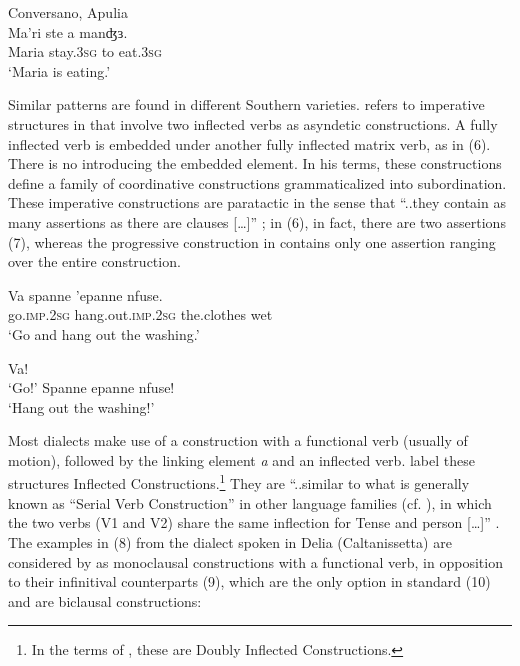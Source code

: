 \documentclass[output=paper]{langsci/langscibook}
\begin{document}
\ea%
         Conversano, Apulia\label{ex:lorusso:5}\\
    \gll Ma'ri  ste     a   manʤɜ.\\
         Maria  stay.\textsc{3sg}  to  eat.\textsc{3sg}\\
    \glt ‘Maria is eating.’
    \z          

Similar patterns are found in different Southern  varieties. \citet{Ledgeway1997} refers to imperative structures in  that involve two inflected verbs as asyndetic constructions. A fully inflected verb is embedded under another fully inflected matrix verb, as in (6). There is no  introducing the embedded element. In his terms, these constructions define a family of coordinative constructions grammaticalized into subordination. These imperative constructions are paratactic in the sense that “..they contain as many assertions as there are clauses […]” \citep[231]{Ledgeway1997}; in (6), in fact, there are two assertions (7), whereas the progressive construction in  contains only one assertion ranging over the entire construction.

\ea%
    \label{ex:lorusso:6}
    \gll Va     spanne     'epanne  nfuse.\\
         go.\textsc{imp.2sg} hang.out.\textsc{imp.2sg}  the.clothes  wet\\
    \glt ‘Go and hang out the washing.’ \citep[230]{Ledgeway1997}
    \z

\ea%
    \label{ex:lorusso:7}
    \ea   Va!\\
    \glt  ‘Go!’
    \ex   Spanne epanne nfuse!\\
    \glt  ‘Hang out the washing!’ \citep[231]{Ledgeway1997}
    \z
\z

Most  dialects make use of a construction with a functional verb (usually of motion), followed by the linking element \textit{a} and an inflected verb. \citet{Cardinaletti2001,Cardinaletti2003} label these structures Inflected Constructions.\footnote{In the terms of \citet{Cruschina2013}, these are Doubly Inflected Constructions.} They are “..similar to what is generally known as ``Serial Verb Construction'' in other language families (cf. \citealt{Aikhenvald2006}), in which the two verbs (V1 and V2) share the same inflection for Tense and person […]” \citep[392]{Di2015}. The examples in (8) from the dialect spoken in Delia (Caltanissetta) are considered by \citet{Di2015} as monoclausal constructions with a functional verb, in opposition to their infinitival counterparts (9), which are the only option in standard  (10) and are biclausal constructions:
\end{document}
